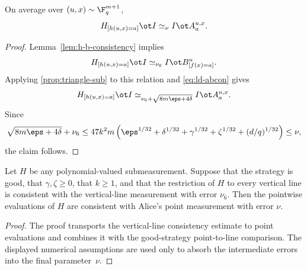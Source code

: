 \begin{corollary}\label{cor:h-a-consistency}
	\leanok
	On average over $(u,x) \sim \F_q^{m+1}$,
	\[
		H_{[h(u,x)=a]} \ot I \simeq_{\nu} I \ot A_a^{u,x}.
	\]
\end{corollary}
\begin{proof}
	\leanok
	Lemma~\ref{lem:h-b-consistency} implies
	\[
		H_{[h(u,x)=a]} \ot I \simeq_{\nu_6} I \ot B^u_{[f(x)=a]}.
	\]
	Applying \ref{prop:triangle-sub} to this relation and \ref{eq:ld-abcon} gives
	\[
		H_{[h(u,x)=a]} \ot I \simeq_{\nu_6+\sqrt{8m\eps+4\delta}} I \ot A_a^{u,x}.
	\]
	Since
	\[
		\sqrt{8m\eps+4\delta} + \nu_6
		\le
		47k^2m\left(\eps^{1/32}+\delta^{1/32}+\gamma^{1/32}+\zeta^{1/32}+(d/q)^{1/32}\right)
		\le \nu,
	\]
	the claim follows.
\end{proof}

\begin{lemma}
	\label{lem:h-a-consistency-from-line-consistency}
	\leanok
	Let $H$ be any polynomial-valued submeasurement. Suppose that the strategy is
	good, that $\gamma,\zeta \ge 0$, that $k \ge 1$, and that the restriction of
	$H$ to every vertical line is consistent with the vertical-line measurement
	with error $\nu_6$. Then the pointwise evaluations of $H$ are consistent with
	Alice's point measurement with error $\nu$.
\end{lemma}
\begin{proof}
	\leanok
	The proof transports the vertical-line consistency estimate to point
	evaluations and combines it with the good-strategy point-to-line comparison.
	The displayed numerical assumptions are used only to absorb the intermediate
	errors into the final parameter~$\nu$.
\end{proof}

